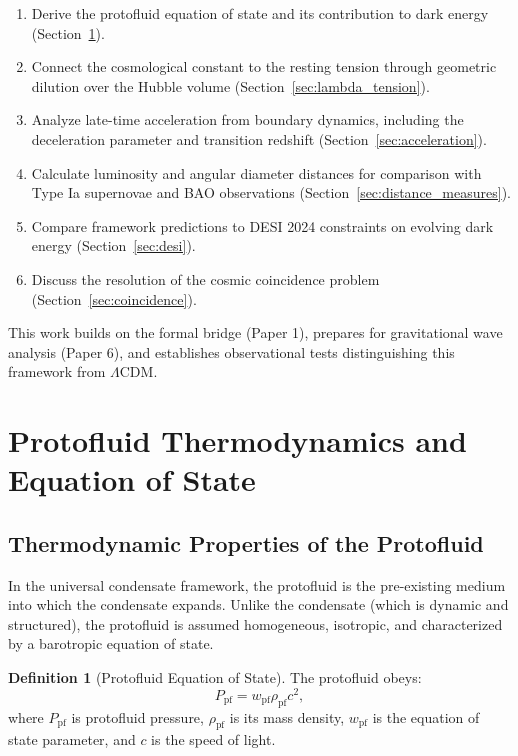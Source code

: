 \documentclass[11pt,a4paper]{article}
\newcommand{\wpf}{\ensuremath{w_{\mathrm{pf}}}}
\newcommand{\Ppf}{\ensuremath{P_{\mathrm{pf}}}}
\newcommand{\rhopf}{\ensuremath{\rho_{\mathrm{pf}}}}
\theoremstyle{definition}
\newtheorem{definition}[theorem]{Definition}
\theoremstyle{remark}
\begin{document}
\begin{enumerate}[leftmargin=*, itemsep=0.3em]
\item Derive the protofluid equation of state and its contribution to dark energy (Section~\ref{sec:protofluid}).
\item Connect the cosmological constant to the resting tension through geometric dilution over the Hubble volume (Section~\ref{sec:lambda_tension}).
\item Analyze late-time acceleration from boundary dynamics, including the deceleration parameter and transition redshift (Section~\ref{sec:acceleration}).
\item Calculate luminosity and angular diameter distances for comparison with Type Ia supernovae and BAO observations (Section~\ref{sec:distance_measures}).
\item Compare framework predictions to DESI 2024 constraints on evolving dark energy (Section~\ref{sec:desi}).
\item Discuss the resolution of the cosmic coincidence problem (Section~\ref{sec:coincidence}).
\end{enumerate}

This work builds on the formal bridge (Paper 1), prepares for gravitational wave analysis (Paper 6), and establishes observational tests distinguishing this framework from $\Lambda$CDM.

\section{Protofluid Thermodynamics and Equation of State}
\label{sec:protofluid}

\subsection{Thermodynamic Properties of the Protofluid}
\label{sec:protofluid_thermo}

In the universal condensate framework, the protofluid is the pre-existing medium into which the condensate expands. Unlike the condensate (which is dynamic and structured), the protofluid is assumed homogeneous, isotropic, and characterized by a barotropic equation of state.

\begin{definition}[Protofluid Equation of State]
\label{def:protofluid_eos}
The protofluid obeys:
\begin{equation}
\label{eq:protofluid_eos}
\boxed{\Ppf = \wpf \rhopf c^2,}
\end{equation}
where $\Ppf$ is protofluid pressure, $\rhopf$ is its mass density, $\wpf$ is the equation of state parameter, and $c$ is the speed of light.
\end{definition}
\end{document}
